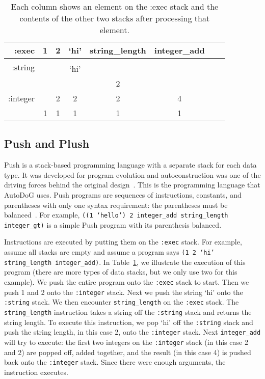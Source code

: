 \documentclass{sig-alternate}
\begin{document}


\begin{table}
	\centering
	\begin{tabular}{|r|c|c|c|c|c|c|c|}
		\hline
		:exec & 1 & 2 & `hi' & string\_length & integer\_add \\
		\hline
		\hline
		\multirow{2}{*}{:string} & & & & & \\
		& & & `hi' &  &  \\
		\hline
		\multirow{3}{*}{:integer} & & & & 2 & \\
		& & 2 & 2 & 2 & 4 \\
		& 1 & 1 & 1 & 1 & 1\\
		\hline
	\end{tabular}
	\caption{Each column shows an element on the :exec stack and the contents of the other two stacks after processing that element.}
	\label{tab:push}
\end{table}

\subsection{Push and Plush}
\label{sec:push}
Push is a stack-based programming language with a separate stack for each data type. It was developed for program evolution and autoconstruction was one of the driving forces behind the original design~\cite{spector:2016}. This is the programming language that AutoDoG uses. Push programs are sequences of instructions, constants, and parentheses with only one syntax requirement: the parentheses must be balanced~\cite{lee:2001}. For example, \texttt{((1 `hello') 2 integer\_add string\_length integer\_gt)} is a simple Push program with its parenthesis balanced.

Instructions are executed by putting them on the \texttt{:exec} stack. For example, assume all stacks are empty and assume a program says \texttt{(1 2 `hi' string\_length integer\_add)}. In Table~\ref{tab:push}, we illustrate the execution of this program (there are more types of data stacks, but we only use two for this example). We push the entire program onto the \texttt{:exec} stack to start. Then we push 1 and 2 onto the \texttt{:integer} stack. Next we push the string `hi' onto the \texttt{:string} stack. We then encounter \texttt{string\_length} on the \texttt{:exec} stack. The \texttt{string\_length} instruction takes a string off the \texttt{:string} stack and returns the string length. To execute this instruction, we pop `hi' off the \texttt{:string} stack and push the string length, in this case 2, onto the \texttt{:integer} stack. Next \texttt{integer\_add} will try to execute: the first two integers on the \texttt{:integer} stack (in this case 2 and 2) are popped off, added together, and the result (in this case 4) is pushed back onto the \texttt{:integer} stack. Since there were enough arguments, the instruction executes.~\cite{lee:tutorial}
\end{document}

